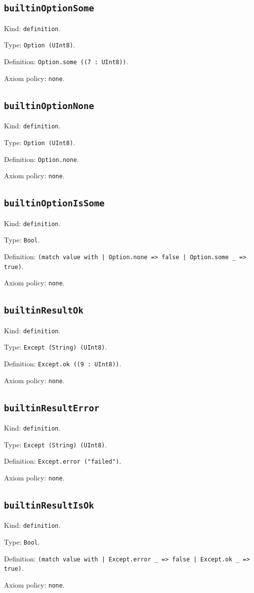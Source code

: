\documentclass[11pt]{article}
\begin{document}
\subsection*{\texttt{builtinOptionSome}}
\noindent Kind: \texttt{definition}.\par
\noindent Type: \texttt{Option (UInt8)}.\par
\noindent Definition: \texttt{Option.some ((7 : UInt8))}.\par
\noindent Axiom policy: \texttt{none}.\par
\subsection*{\texttt{builtinOptionNone}}
\noindent Kind: \texttt{definition}.\par
\noindent Type: \texttt{Option (UInt8)}.\par
\noindent Definition: \texttt{Option.none}.\par
\noindent Axiom policy: \texttt{none}.\par
\subsection*{\texttt{builtinOptionIsSome}}
\noindent Kind: \texttt{definition}.\par
\noindent Type: \texttt{Bool}.\par
\noindent Definition: \texttt{(match value with | Option.none => false | Option.some \_ => true)}.\par
\noindent Axiom policy: \texttt{none}.\par
\subsection*{\texttt{builtinResultOk}}
\noindent Kind: \texttt{definition}.\par
\noindent Type: \texttt{Except (String) (UInt8)}.\par
\noindent Definition: \texttt{Except.ok ((9 : UInt8))}.\par
\noindent Axiom policy: \texttt{none}.\par
\subsection*{\texttt{builtinResultError}}
\noindent Kind: \texttt{definition}.\par
\noindent Type: \texttt{Except (String) (UInt8)}.\par
\noindent Definition: \texttt{Except.error ("failed")}.\par
\noindent Axiom policy: \texttt{none}.\par
\subsection*{\texttt{builtinResultIsOk}}
\noindent Kind: \texttt{definition}.\par
\noindent Type: \texttt{Bool}.\par
\noindent Definition: \texttt{(match value with | Except.error \_ => false | Except.ok \_ => true)}.\par
\noindent Axiom policy: \texttt{none}.\par
\end{document}
